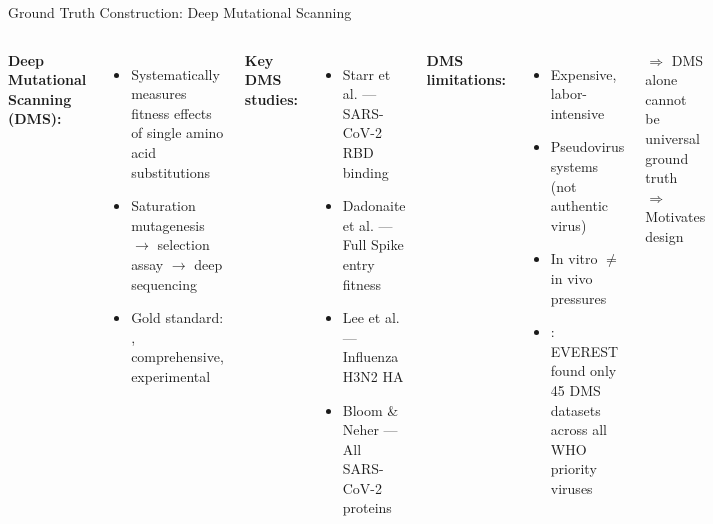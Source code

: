 \begin{frame}{Ground Truth Construction: Deep Mutational Scanning}
  \begin{columns}[T]
    \textbf{Deep Mutational Scanning (DMS):}
    \begin{itemize}
      \item Systematically measures fitness effects of  single amino acid substitutions
      \item Saturation mutagenesis $\rightarrow$ selection assay $\rightarrow$ deep sequencing
      \item Gold standard: , comprehensive, experimental
    \end{itemize}

    \vspace{0.5em}
    \textbf{Key DMS studies:}
    \begin{itemize}
      \item Starr et al. --- SARS-CoV-2 RBD binding
      \item Dadonaite et al. --- Full Spike entry fitness
      \item Lee et al. --- Influenza H3N2 HA
      \item Bloom \& Neher --- All SARS-CoV-2 proteins
    \end{itemize}

    \textbf{DMS limitations:}
    \begin{itemize}
      \item[\xmark] Expensive, labor-intensive
      \item[\xmark] Pseudovirus systems (not authentic virus)
      \item[\xmark] In vitro $\neq$ in vivo pressures
      \item[\xmark] : EVEREST found only 45 DMS datasets across all WHO priority viruses
    \end{itemize}

    \vspace{0.5em}
    $\Rightarrow$ DMS alone cannot be universal ground truth\\
    $\Rightarrow$ Motivates  design
  \end{columns}
\end{frame}

